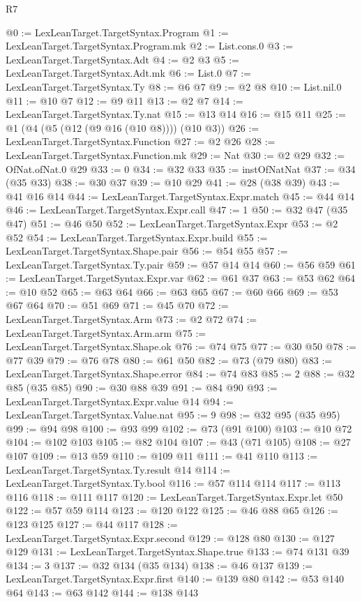 \begin{lexlean}{R7}
\begin{coremodule}
{{{{{{{{{{{{{{{{{{{{{{{{{{{{{{{{{{{{{{{{{{@0 := LexLeanTarget.TargetSyntax.Program
@1 := LexLeanTarget.TargetSyntax.Program.mk
@2 := List.cons.{0}
@3 := LexLeanTarget.TargetSyntax.Adt
@4 := @2 @3
@5 := LexLeanTarget.TargetSyntax.Adt.mk
@6 := List.{0}
@7 := LexLeanTarget.TargetSyntax.Ty
@8 := @6 @7
@9 := @2 @8
@10 := List.nil.{0}
@11 := @10 @7
@12 := @9 @11
@13 := @2 @7
@14 := LexLeanTarget.TargetSyntax.Ty.nat
@15 := @13 @14
@16 := @15 @11
@25 := @1 (@4 (@5 (@12 (@9 @16 (@10 @8)))) (@10 @3))
@26 := LexLeanTarget.TargetSyntax.Function
@27 := @2 @26
@28 := LexLeanTarget.TargetSyntax.Function.mk
@29 := Nat
@30 := @2 @29
@32 := OfNat.ofNat.{0} @29
@33 := 0
@34 := @32 @33
@35 := instOfNatNat
@37 := @34 (@35 @33)
@38 := @30 @37
@39 := @10 @29
@41 := @28 (@38 @39)
@43 := @41 @16 @14
@44 := LexLeanTarget.TargetSyntax.Expr.match
@45 := @44 @14
@46 := LexLeanTarget.TargetSyntax.Expr.call
@47 := 1
@50 := @32 @47 (@35 @47)
@51 := @46 @50
@52 := LexLeanTarget.TargetSyntax.Expr
@53 := @2 @52
@54 := LexLeanTarget.TargetSyntax.Expr.build
@55 := LexLeanTarget.TargetSyntax.Shape.pair
@56 := @54 @55
@57 := LexLeanTarget.TargetSyntax.Ty.pair
@59 := @57 @14 @14
@60 := @56 @59
@61 := LexLeanTarget.TargetSyntax.Expr.var
@62 := @61 @37
@63 := @53 @62
@64 := @10 @52
@65 := @63 @64
@66 := @63 @65
@67 := @60 @66
@69 := @53 @67 @64
@70 := @51 @69
@71 := @45 @70
@72 := LexLeanTarget.TargetSyntax.Arm
@73 := @2 @72
@74 := LexLeanTarget.TargetSyntax.Arm.arm
@75 := LexLeanTarget.TargetSyntax.Shape.ok
@76 := @74 @75
@77 := @30 @50
@78 := @77 @39
@79 := @76 @78
@80 := @61 @50
@82 := @73 (@79 @80)
@83 := LexLeanTarget.TargetSyntax.Shape.error
@84 := @74 @83
@85 := 2
@88 := @32 @85 (@35 @85)
@90 := @30 @88 @39
@91 := @84 @90
@93 := LexLeanTarget.TargetSyntax.Expr.value @14
@94 := LexLeanTarget.TargetSyntax.Value.nat
@95 := 9
@98 := @32 @95 (@35 @95)
@99 := @94 @98
@100 := @93 @99
@102 := @73 (@91 @100)
@103 := @10 @72
@104 := @102 @103
@105 := @82 @104
@107 := @43 (@71 @105)
@108 := @27 @107
@109 := @13 @59
@110 := @109 @11
@111 := @41 @110
@113 := LexLeanTarget.TargetSyntax.Ty.result @14
@114 := LexLeanTarget.TargetSyntax.Ty.bool
@116 := @57 @114 @114
@117 := @113 @116
@118 := @111 @117
@120 := LexLeanTarget.TargetSyntax.Expr.let @50
@122 := @57 @59 @114
@123 := @120 @122
@125 := @46 @88 @65
@126 := @123 @125
@127 := @44 @117
@128 := LexLeanTarget.TargetSyntax.Expr.second
@129 := @128 @80
@130 := @127 @129
@131 := LexLeanTarget.TargetSyntax.Shape.true
@133 := @74 @131 @39
@134 := 3
@137 := @32 @134 (@35 @134)
@138 := @46 @137
@139 := LexLeanTarget.TargetSyntax.Expr.first
@140 := @139 @80
@142 := @53 @140 @64
@143 := @63 @142
@144 := @138 @143
}}}}}}}}}}}}}}}}}}}}}}}}}}}}}}}}}}}}}}}}}}
\end{coremodule}
\end{lexlean}
